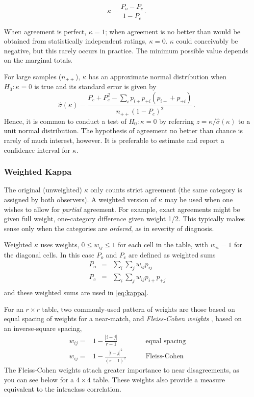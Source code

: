 \documentclass[10pt,krantz2]{krantz}\usepackage[]{graphicx}\usepackage[]{color}
\begin{document}
\begin{equation}\label{eq:kappa}
  \kappa =  \frac{ P_o - P_c } { 1 - P_c }
  \period
\end{equation}

When agreement is perfect, \(\kappa = 1\);  when agreement is no
better than would be obtained from statistically independent ratings,
$\kappa = 0$.
$\kappa$ could conceivably be negative, but this rarely occurs in practice.
The minimum possible value depends on the marginal totals.

For large samples ($n_{++}$), $\kappa$ has an approximate normal
distribution when $H_0 : \kappa = 0$ is true
and its standard error \citep{Fleiss:73,Fleiss-etal:69} is given by
\begin{equation*}
 \hat{\sigma}(\kappa) =  \frac{ P_c + P_c^2 - \sum_i p_{i+} p_{+i} (p_{i+} + p_{+i}) } { n_{++} (1 - P_c)^2 }
 \period
\end{equation*}
Hence, it is common to conduct a test of $H_0 : \kappa = 0$ by
referring $z = \kappa / \hat{\sigma}(\kappa)$
to a unit normal distribution.
The hypothesis of agreement no better than chance is rarely of much
interest, however.  It is preferable to estimate and report a
confidence interval for $\kappa$.

\subsubsection{Weighted Kappa}
The original (unweighted) \(\kappa\) only counts strict agreement (the same
category is assigned by both observers).  A weighted version of
\(\kappa\)
\citep{Cohen:68} may be used when one wishes to allow for \emph{partial} agreement.
For example, exact agreements might be given full weight,
one-category difference given weight 1/2.  This typically makes sense
only when the categories are \emph{ordered}, as in severity of
diagnosis.

Weighted \(\kappa\) uses weights, $0 \le w_{ij} \le 1$ for each cell in the
table, with $w_{ii} =1$ for the diagonal cells.
In this case $P_o$ and $P_c$ are defined as weighted sums
\begin{eqnarray*}
P_o  & = & \sum_i \sum_j w_{ij} p_{ij} \\
P_c  & = & \sum_i \sum_j w_{ij} p_{i+} p_{+j}\\
\end{eqnarray*}
and these weighted sums are used in \eqref{eq:kappa}.

For an $r \times r$ table, two commonly-used pattern of weights are those based on
equal spacing of weights
\citep{CicchettiAllison:71}
for a near-match,
and
\emph{Fleiss-Cohen weights}
\citep{FleissCohen:73}, based on an inverse-square
spacing,
\begin{eqnarray*}
w_{ij} = & 1 - \frac{|i-j|}{r-1} & \quad\quad\mbox{equal spacing} \\
w_{ij} = & 1 - \frac{|i-j|^2}{(r-1)^2} & \quad\quad\mbox{Fleiss-Cohen}
\end{eqnarray*}
The Fleiss-Cohen weights attach greater importance
to near disagreements, as you can see below for a $4 \times 4$ table.
These weights also provide a measure equivalent to the intraclass
correlation.
\end{document}
